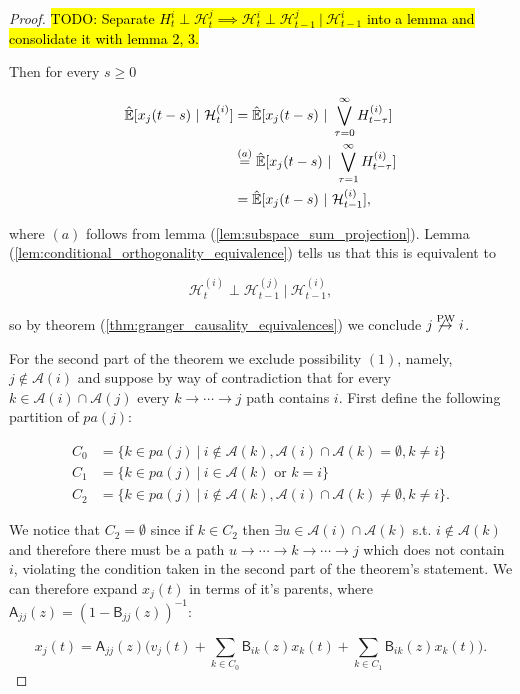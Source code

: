 \documentclass[12pt]{article}
\def\pwgc{\overset{\text{PW}}{\rightarrow}}  %
\def\B{\mathsf{B}}  %
\def\A{\mathsf{A}}  %
\def\H{\mathcal{H}}  %
\newcommand{\linE}[2]{\hat{\E}[#1\ |\ #2]}  %
\newcommand{\pa}[1]{pa(#1)}  %
\newcommand{\anc}[1]{\mathcal{A}(#1)}  %
\begin{document}
\begin{proof}
  \hl{TODO: Separate $H_t^i \perp \H_t^j \implies \H_t^i \perp \H_{t - 1}^j\ |\ \H_{t - 1}^i$ into a lemma and consolidate it with lemma 2, 3.}

  Then for every $s \ge 0$

  \begin{align*}
    \linE{x_j(t - s)}{\H_t^{(i)}} &= \linE{x_j(t - s)}{\bigvee_{\tau = 0}^\infty H_{t - \tau}^{(i)}}\\
    &\overset{(a)}{=} \linE{x_j(t - s)}{\bigvee_{\tau = 1}^\infty H_{t - \tau}^{(i)}}\\
    &= \linE{x_j(t - s)}{\H_{t - 1}^{(i)}},
  \end{align*}

  where $(a)$ follows from lemma (\ref{lem:subspace_sum_projection}).  Lemma (\ref{lem:conditional_orthogonality_equivalence}) tells us that this is equivalent to

  \begin{equation*}
    \H_t^{(i)} \perp \H_{t - 1}^{(j)}\ |\ \H_{t - 1}^{(i)},
  \end{equation*}

  so by theorem (\ref{thm:granger_causality_equivalences}) we conclude $j \not\pwgc i$.

  For the second part of the theorem we exclude possibility $(1)$, namely, $j \not \in \anc{i}$ and suppose by way of contradiction that for every $k \in \anc{i} \cap \anc{j}$ every $k \rightarrow \cdots \rightarrow j$ path contains $i$.  First define the following partition of $\pa{j}$:

  \begin{align*}
    C_0 &= \{k \in \pa{j}\ |\ i \not\in \anc{k}, \anc{i} \cap \anc{k} = \emptyset, k \ne i\}\\
    C_1 &= \{k \in \pa{j}\ |\ i \in \anc{k} \text{ or } k = i\}\\
    C_2 &= \{k \in \pa{j}\ |\ i \not\in \anc{k}, \anc{i} \cap \anc{k} \ne \emptyset, k \ne i\}.
  \end{align*}

  We notice that $C_2 = \emptyset$ since if $k \in C_2$ then $\exists u \in \anc{i} \cap \anc{k}$ s.t. $i \not \in \anc{k}$ and therefore there must be a path $u \rightarrow \cdots \rightarrow k \rightarrow \cdots \rightarrow j$ which does not contain $i$, violating the condition taken in the second part of the theorem's statement.  We can therefore expand $x_j(t)$ in terms of it's parents, where $\A_{jj}(z) = (1 - \B_{jj}(z))^{-1}$:

  \begin{equation}
    \label{eqn:xj_partition_expansion}
    x_j(t) = \A_{jj}(z)\Big(v_j(t) + \sum_{k \in C_0}\B_{ik}(z)x_k(t) + \sum_{k \in C_1}\B_{ik}(z)x_k(t)\Big).
  \end{equation}


\end{proof}
\end{document}
